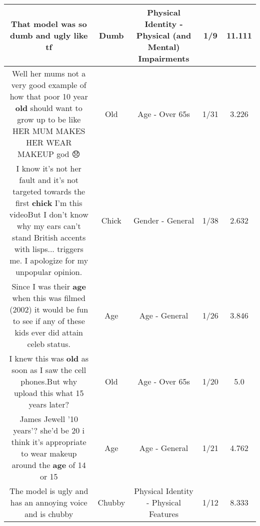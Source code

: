 \documentclass[11pt]{article}
\newlength\mylength
\begin{document}
\begin{center}
\begin{longtable}{|C{.65\mylength}|C{.30\mylength}|C{.12\mylength}|C{.12\mylength}|C{.12\mylength}|}
  \small That model was so \textbf{dumb} and ugly like tf\normalsize   & Dumb & Physical Identity - Physical (and Mental) Impairments & 1/9 & 11.111 \\  \hline
  \small Well her mums not a very good example of how that poor 10 year \textbf{old} should want to grow up to be like HER MUM MAKES HER WEAR MAKEUP god 😞\normalsize   & Old & Age - Over 65s & 1/31 & 3.226 \\  \hline
  \small I know it's not her fault and it's not targeted towards the first \textbf{chick} I'm this videoBut I don't know why my ears can't stand British accents with lisps... triggers me. I apologize for my unpopular opinion.\normalsize   & Chick & Gender - General & 1/38 & 2.632 \\  \hline
  \small Since I was their \textbf{age} when this was filmed (2002) it would be fun to see if any of these kids ever did attain celeb status.\normalsize   & Age & Age - General & 1/26 & 3.846 \\  \hline
  \small I knew this was  \textbf{old} as soon as I saw the  cell phones.But why upload  this what 15 years later?\normalsize   & Old & Age - Over 65s & 1/20 & 5.0 \\  \hline
  \small James Jewell '10 years'? she'd be 20 i think it's appropriate to wear makeup around the \textbf{age} of 14 or 15\normalsize   & Age & Age - General & 1/21 & 4.762 \\  \hline
  \small The model is ugly and has an annoying voice and is chubby\normalsize   & Chubby & Physical Identity - Physical Features & 1/12 & 8.333 \\  \hline

\end{longtable}
\end{center}
\end{document}
